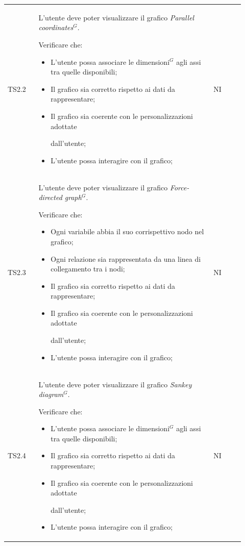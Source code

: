 \begin{longtable}{p{0.12\linewidth}p{0.68\linewidth}p{0.12\linewidth}}
    \rowcolor[RGB]{216, 235, 171}
    TS2.2 &
    L'utente deve poter visualizzare il grafico \textit{Parallel coordinates}$^{G}$.
    \par Verificare che:
    \begin{itemize}
        \item L'utente possa associare le dimensioni$^{G}$ agli assi tra quelle disponibili;
        \item Il grafico sia corretto rispetto ai dati da rappresentare;
        \item Il grafico sia coerente con le personalizzazioni adottate \par dall'utente;
        \item L'utente possa interagire con il grafico;
    \end{itemize}&
    NI\\

    \rowcolor[RGB]{233, 245, 206}
    TS2.3 &
    L'utente deve poter visualizzare il grafico \textit{Force-directed graph}$^{G}$.
    \par Verificare che:
    \begin{itemize}
        \item Ogni variabile abbia il suo corrispettivo nodo nel grafico;
        \item Ogni relazione sia rappresentata da una linea di collegamento tra i
        nodi;        
        \item Il grafico sia corretto rispetto ai dati da rappresentare;
        \item Il grafico sia coerente con le personalizzazioni adottate \par dall'utente;
        \item L'utente possa interagire con il grafico;
    \end{itemize}&
    NI\\

    \rowcolor[RGB]{216, 235, 171}
    TS2.4 &
    L'utente deve poter visualizzare il grafico \textit{Sankey diagram}$^{G}$.
    \par Verificare che:
    \begin{itemize}
        \item L'utente possa associare le dimensioni$^{G}$ agli assi tra quelle disponibili;
        \item Il grafico sia corretto rispetto ai dati da rappresentare;
        \item Il grafico sia coerente con le personalizzazioni adottate \par dall'utente;
        \item L'utente possa interagire con il grafico;
    \end{itemize}&
    NI\\


\end{longtable}
